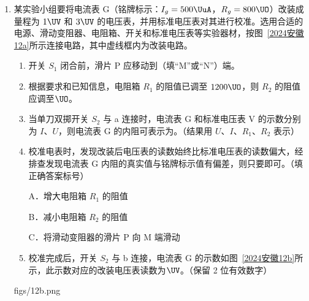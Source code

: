 \documentclass[\gkver]{gaokaozhenti}
\begin{document}
\begin{enumerate}
{可知绿光的折射率大于红光的折射率，又因为绿光的频率大于红光的频率，所以频率大，折射率大。

（3）根据折射定律可知，玻璃的折射率为

$n_{\text{玻璃}} = \frac{\sin\alpha_{1}}{\sin\alpha_{2}}$

该介质的折射率为

$n_{\text{介质}} = \frac{\sin\alpha_{1}}{\sin\alpha_{3}}$

其中 $\alpha_{2} < \alpha_{3}$，所以 $n_{\text{玻璃}} > n_{\text{介质}}$。
}

\item
某实验小组要将电流表 G（铭牌标示：$I_{g} = 500 \UuA$，$R_{g} = 800 \UO$）改装成量程为 $1 \UV$ 和 $3 \UV$ 的电压表，并用标准电压表对其进行校准。选用合适的电源、滑动变阻器、电阻箱、开关和标准电压表等实验器材，按图~\ref{2024安徽12a}所示连接电路，其中虚线框内为改装电路。
\begin{enumerate}
	\item
	开关 $S_{1}$ 闭合前，滑片 P 应移动到（填“M”或“N”）端。
	\item
	根据要求和已知信息，电阻箱 $R_{1}$ 的阻值已调至 $1200 \UO$，则 $R_{2}$ 的阻值应调至$\UO$。
	\item
	当单刀双掷开关 $S_{2}$ 与 a 连接时，电流表 G 和标准电压表 V 的示数分别为 $I$、$U$，则电流表 G 的内阻可表示为。（结果用 $U$、$I$、$R_{1}$、$R_{2}$ 表示）
	\item
	校准电表时，发现改装后电压表的读数始终比标准电压表的读数偏大，经排查发现电流表 G 内阻的真实值与铭牌标示值有偏差，则只要即可。（填正确答案标号）

	A．增大电阻箱 $R_{1}$ 的阻值

	B．减小电阻箱 $R_{2}$ 的阻值

	C．将滑动变阻器的滑片 P 向 M 端滑动
	\item
	校准完成后，开关 $S_{2}$ 与 b 连接，电流表 G 的示数如图~\ref{2024安徽12b}所示，此示数对应的改装电压表读数为$\UV$。（保留 2 位有效数字）
\end{enumerate}
{figs/12b.png}

\end{enumerate}
\end{document}
